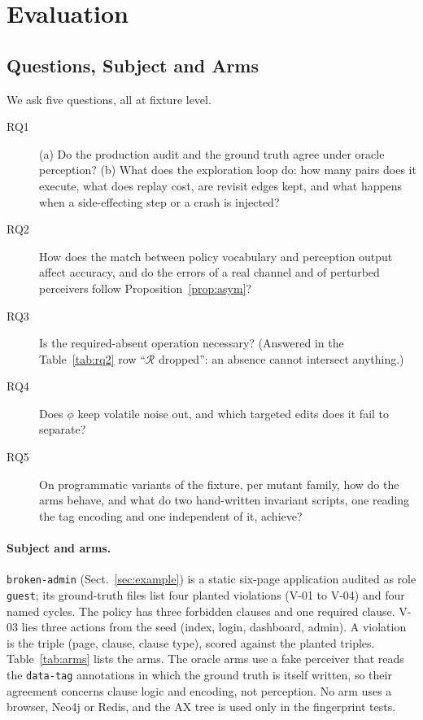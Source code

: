\section{Evaluation}
\label{sec:eval}

\subsection{Questions, Subject and Arms}

We ask five questions, all at fixture level.
\begin{description}
\item[RQ1] (a) Do the production audit and the ground truth agree under oracle
perception? (b) What does the exploration loop do: how many pairs does it execute,
what does replay cost, are revisit edges kept, and what happens when a
side-effecting step or a crash is injected?
\item[RQ2] How does the match between policy vocabulary and perception output
affect accuracy, and do the errors of a real channel and of perturbed perceivers
follow Proposition~\ref{prop:asym}?
\item[RQ3] Is the required-absent operation necessary? (Answered in the Table~\ref{tab:rq2} row ``$\mathcal R$ dropped'': an absence cannot intersect anything.)
\item[RQ4] Does $\phi$ keep volatile noise out, and which targeted edits does it
fail to separate?
\item[RQ5] On programmatic variants of the fixture, per mutant family, how do the
arms behave, and what do two hand-written invariant scripts, one reading the tag
encoding and one independent of it, achieve?
\end{description}

\paragraph{Subject and arms.}
\texttt{broken-admin} (Sect.~\ref{sec:example}) is a static six-page application
audited as role \texttt{guest}; its ground-truth files list four planted
violations (V-01 to V-04) and four named cycles. The policy has three forbidden
clauses and one required clause. V-03 lies three actions from the seed (index,
login, dashboard, admin). A violation is the triple (page, clause, clause type),
scored against the planted triples. Table~\ref{tab:arms} lists the arms. The
oracle arms use a fake perceiver that reads the \texttt{data-tag} annotations in
which the ground truth is itself written, so their agreement concerns clause logic
and encoding, not perception. No arm uses a browser, Neo4j or Redis, and the AX
tree is used only in the fingerprint tests.


